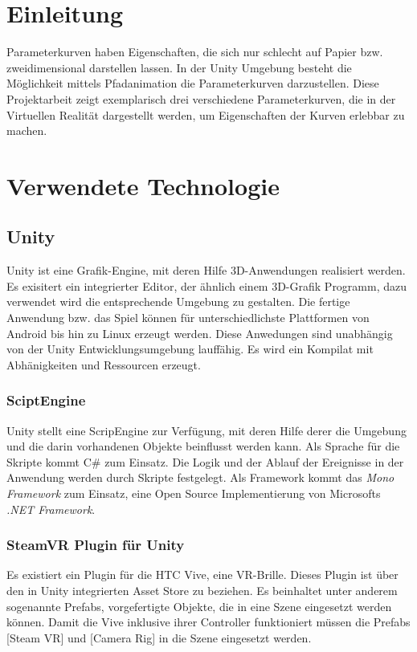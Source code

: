 \chapter{Einleitung}
\label{Einleitung}

Parameterkurven haben Eigenschaften, die sich nur schlecht auf Papier bzw. zweidimensional darstellen lassen.
In der Unity Umgebung besteht die Möglichkeit mittels Pfadanimation die Parameterkurven darzustellen. 
Diese Projektarbeit zeigt exemplarisch drei verschiedene Parameterkurven, die in der Virtuellen Realität dargestellt werden, um Eigenschaften der Kurven erlebbar zu machen. 

\chapter{Verwendete Technologie}
\label{Technologie}
\section{Unity}
Unity ist eine Grafik-Engine, mit deren Hilfe 3D-Anwendungen realisiert werden. Es exisitert ein integrierter Editor, der ähnlich einem 3D-Grafik Programm, dazu verwendet wird die entsprechende Umgebung zu gestalten. Die fertige Anwendung bzw. das Spiel können für unterschiedlichste Plattformen von Android bis hin zu Linux erzeugt werden. Diese Anwedungen sind unabhängig von der Unity Entwicklungsumgebung lauffähig. Es wird ein Kompilat mit Abhänigkeiten und Ressourcen erzeugt.

\subsection{SciptEngine}
Unity stellt eine ScripEngine zur Verfügung, mit deren Hilfe derer die Umgebung und die darin vorhandenen Objekte beinflusst werden kann. Als Sprache für die Skripte kommt C\# zum Einsatz. Die Logik und der Ablauf der Ereignisse in der Anwendung werden durch Skripte festgelegt. Als Framework kommt das \emph{Mono Framework} zum Einsatz, eine Open Source Implementierung von Microsofts \emph{.NET Framework}.

\subsection{SteamVR Plugin für Unity}
Es existiert ein Plugin für die HTC Vive, eine VR-Brille. Dieses Plugin ist über den in Unity integrierten Asset Store zu beziehen. Es beinhaltet unter anderem sogenannte Prefabs, vorgefertigte Objekte, die in eine Szene eingesetzt werden können. Damit die Vive inklusive ihrer Controller funktioniert müssen die Prefabs [Steam VR] und [Camera Rig] in die Szene eingesetzt werden. 

